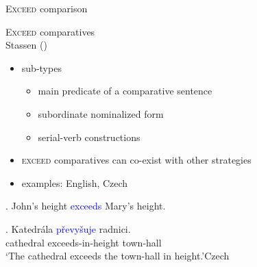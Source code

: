 \documentclass[12pt]{beamer}
\begin{document}
\begin{frame}{\textsc{Exceed} comparison}

\textsc{Exceed} comparatives\\
\scriptsize Stassen (\citeyear{stassen1985comparison})\normalsize

\begin{itemize}
\item sub-types
\begin{itemize}
\item main predicate of a comparative sentence
\item subordinate nominalized form
\item serial-verb constructions
\end{itemize}
\item \textsc{exceed} comparatives can co-exist with other strategies
\item examples: English, Czech
\end{itemize}
\ex. John's height \textcolor{blue}{exceeds} Mary's height.\label{ex:exceed-english}

\exg. Katedrála \textcolor{blue}{převyšuje} radnici.\label{ex:exceed-czech}\\
cathedral exceeds-in-height town-hall\\
`The cathedral exceeds the town-hall in height.'\hfill \footnotesize Czech \normalsize

\end{frame}
\end{document}
